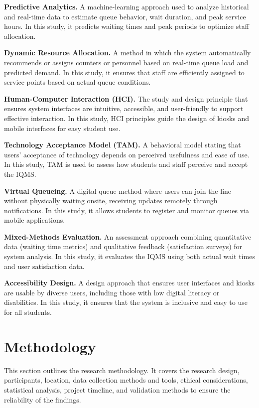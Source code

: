 \documentclass{research}
\begin{document}
\textbf {Predictive Analytics.} A machine-learning approach used to analyze historical and real-time data to estimate queue behavior, wait duration, and peak service hours. In this study, it predicts waiting times and peak periods to optimize staff allocation.

\textbf {Dynamic Resource Allocation.} A method in which the system automatically recommends or assigns counters or personnel based on real-time queue load and predicted demand. In this study, it ensures that staff are efficiently assigned to service points based on actual queue conditions.

\textbf {Human-Computer Interaction (HCI).} The study and design principle that ensures system interfaces are intuitive, accessible, and user-friendly to support effective interaction. In this study, HCI principles guide the design of kiosks and mobile interfaces for easy student use.

\textbf {Technology Acceptance Model (TAM).} A behavioral model stating that users' acceptance of technology depends on perceived usefulness and ease of use. In this study, TAM is used to assess how students and staff perceive and accept the IQMS.

\textbf {Virtual Queueing.} A digital queue method where users can join the line without physically waiting onsite, receiving updates remotely through notifications. In this study, it allows students to register and monitor queues via mobile applications.

\textbf {Mixed-Methods Evaluation.} An assessment approach combining quantitative data (waiting time metrics) and qualitative feedback (satisfaction surveys) for system analysis. In this study, it evaluates the IQMS using both actual wait times and user satisfaction data.

\textbf {Accessibility Design.} A design approach that ensures user interfaces and kiosks are usable by diverse users, including those with low digital literacy or disabilities. In this study, it ensures that the system is inclusive and easy to use for all students.

\clearpage

\chapter{Methodology}

This section outlines the research methodology. It covers the research design, participants, location, data collection methods and tools, ethical considerations, statistical analysis, project timeline, and validation methods to ensure the reliability of the findings.
\end{document}
